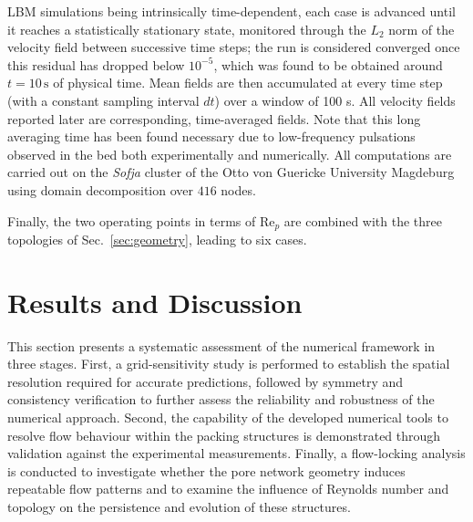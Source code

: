 LBM simulations being intrinsically time-dependent, each case is advanced until it reaches a statistically stationary state, monitored through the $L_2$ norm of the velocity field between successive time steps; the run is
considered converged once this \added{[relative]} residual has dropped below $10^{-5}$, which was found to be obtained around $t = 10\,\mathrm{s}$ of physical time. Mean fields are then accumulated at every time step (with a constant sampling interval $dt$) over a window of 100 s. All velocity fields reported later are corresponding, time-averaged fields. Note that this long averaging time has been found necessary due to low-frequency pulsations observed in the bed both experimentally and numerically. All computations are carried out on the \emph{Sofja} cluster of the Otto von Guericke University Magdeburg using domain decomposition over $416$ nodes.

Finally, the two operating points in terms of Re$_p$ are combined with the three topologies of Sec.~\ref{sec:geometry}, leading to six cases.

\section{Results and Discussion}
\label{sec:results}
This section presents a systematic assessment of the numerical framework in three stages. First, a grid-sensitivity study is performed to establish the spatial resolution required for accurate predictions, followed by symmetry and consistency verification to further assess the reliability and robustness of the numerical approach. Second, the capability of the developed numerical tools to resolve flow behaviour within the packing structures is demonstrated through validation against the experimental measurements. Finally, a flow-locking analysis is conducted to investigate whether the pore network geometry induces repeatable flow patterns and to examine the influence of Reynolds number and topology on the persistence and evolution of these structures.

